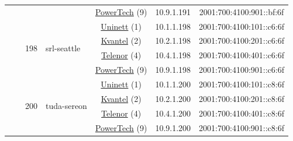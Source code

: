 \begin{small}
\begin{center}
\begin{longtable}{|c|c|c|c|c|c|c|c|}
  &  &  &  & \multicolumn{2}{|c|}{\tiny{\href{http://www.powertech.no}{PowerTech} (9)}} & \tiny{10.9.1.191} & \tiny{2001:700:4100:901::bf:6f} \\* \cline{3-3}\cline{4-4}\cline{5-5}\cline{6-6}\cline{7-7}\cline{8-8}
  &  & \multirow{4}{*}{\tiny{198}} & \multicolumn{1}{|l|}{\multirow{4}{*}{\tiny{srl-seattle}}} & \multicolumn{2}{|c|}{\tiny{\href{https://www.uninett.no}{Uninett} (1)}} & \tiny{10.1.1.198} & \tiny{2001:700:4100:101::c6:6f} \\* \cline{5-5}\cline{6-6}\cline{7-7}\cline{8-8}
  &  &  &  & \multicolumn{2}{|c|}{\tiny{\href{http://kvantel.no}{Kvantel} (2)}} & \tiny{10.2.1.198} & \tiny{2001:700:4100:201::c6:6f} \\* \cline{5-5}\cline{6-6}\cline{7-7}\cline{8-8}
  &  &  &  & \multicolumn{2}{|c|}{\tiny{\href{https://www.telenor.no}{Telenor} (4)}} & \tiny{10.4.1.198} & \tiny{2001:700:4100:401::c6:6f} \\* \cline{5-5}\cline{6-6}\cline{7-7}\cline{8-8}
  &  &  &  & \multicolumn{2}{|c|}{\tiny{\href{http://www.powertech.no}{PowerTech} (9)}} & \tiny{10.9.1.198} & \tiny{2001:700:4100:901::c6:6f} \\* \cline{3-3}\cline{4-4}\cline{5-5}\cline{6-6}\cline{7-7}\cline{8-8}
  &  & \multirow{4}{*}{\tiny{200}} & \multicolumn{1}{|l|}{\multirow{4}{*}{\tiny{tuda-sereon}}} & \multicolumn{2}{|c|}{\tiny{\href{https://www.uninett.no}{Uninett} (1)}} & \tiny{10.1.1.200} & \tiny{2001:700:4100:101::c8:6f} \\* \cline{5-5}\cline{6-6}\cline{7-7}\cline{8-8}
  &  &  &  & \multicolumn{2}{|c|}{\tiny{\href{http://kvantel.no}{Kvantel} (2)}} & \tiny{10.2.1.200} & \tiny{2001:700:4100:201::c8:6f} \\* \cline{5-5}\cline{6-6}\cline{7-7}\cline{8-8}
  &  &  &  & \multicolumn{2}{|c|}{\tiny{\href{https://www.telenor.no}{Telenor} (4)}} & \tiny{10.4.1.200} & \tiny{2001:700:4100:401::c8:6f} \\* \cline{5-5}\cline{6-6}\cline{7-7}\cline{8-8}
  &  &  &  & \multicolumn{2}{|c|}{\tiny{\href{http://www.powertech.no}{PowerTech} (9)}} & \tiny{10.9.1.200} & \tiny{2001:700:4100:901::c8:6f} \\ \hline
\end{longtable}
\end{center}
\end{small}



